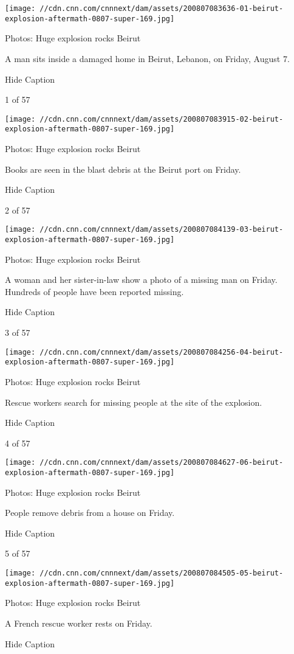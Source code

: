\texttt{[image: //cdn.cnn.com/cnnnext/dam/assets/200807083636-01-beirut-explosion-aftermath-0807-super-169.jpg]}

Photos: Huge explosion rocks Beirut

A man sits inside a damaged home in Beirut, Lebanon, on Friday, August
7.

Hide Caption

1 of 57

\texttt{[image: //cdn.cnn.com/cnnnext/dam/assets/200807083915-02-beirut-explosion-aftermath-0807-super-169.jpg]}

Photos: Huge explosion rocks Beirut

Books are seen in the blast debris at the Beirut port on Friday.

Hide Caption

2 of 57

\texttt{[image: //cdn.cnn.com/cnnnext/dam/assets/200807084139-03-beirut-explosion-aftermath-0807-super-169.jpg]}

Photos: Huge explosion rocks Beirut

A woman and her sister-in-law show a photo of a missing man on Friday.
Hundreds of people have been reported missing.

Hide Caption

3 of 57

\texttt{[image: //cdn.cnn.com/cnnnext/dam/assets/200807084256-04-beirut-explosion-aftermath-0807-super-169.jpg]}

Photos: Huge explosion rocks Beirut

Rescue workers search for missing people at the site of the explosion.

Hide Caption

4 of 57

\texttt{[image: //cdn.cnn.com/cnnnext/dam/assets/200807084627-06-beirut-explosion-aftermath-0807-super-169.jpg]}

Photos: Huge explosion rocks Beirut

People remove debris from a house on Friday.

Hide Caption

5 of 57

\texttt{[image: //cdn.cnn.com/cnnnext/dam/assets/200807084505-05-beirut-explosion-aftermath-0807-super-169.jpg]}

Photos: Huge explosion rocks Beirut

A French rescue worker rests on Friday.

Hide Caption

